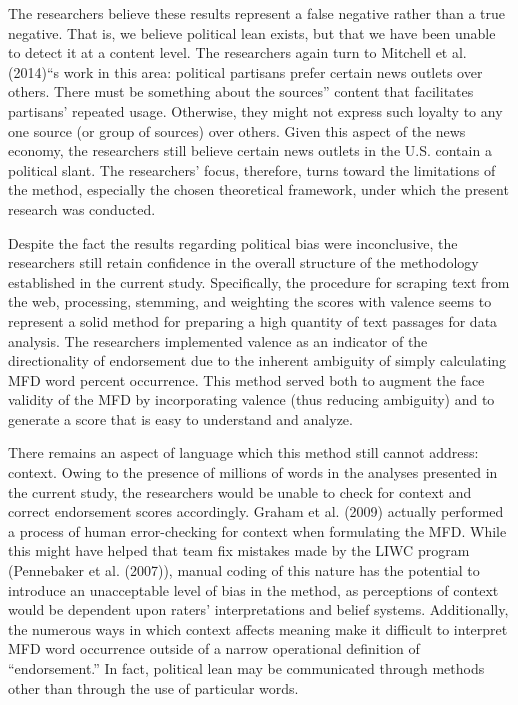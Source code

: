 \documentclass[english,,man]{apa6}
\begin{document}
The researchers believe these results represent a false negative rather than a true negative. That is, we believe political lean exists, but that we have been unable to detect it at a content level. The researchers again turn to Mitchell et al. (2014)\enquote{s work in this area: political partisans prefer certain news outlets over others. There must be something about the sources} content that facilitates partisans' repeated usage. Otherwise, they might not express such loyalty to any one source (or group of sources) over others. Given this aspect of the news economy, the researchers still believe certain news outlets in the U.S. contain a political slant. The researchers' focus, therefore, turns toward the limitations of the method, especially the chosen theoretical framework, under which the present research was conducted.

Despite the fact the results regarding political bias were inconclusive, the researchers still retain confidence in the overall structure of the methodology established in the current study. Specifically, the procedure for scraping text from the web, processing, stemming, and weighting the scores with valence seems to represent a solid method for preparing a high quantity of text passages for data analysis. The researchers implemented valence as an indicator of the directionality of endorsement due to the inherent ambiguity of simply calculating MFD word percent occurrence. This method served both to augment the face validity of the MFD by incorporating valence (thus reducing ambiguity) and to generate a score that is easy to understand and analyze.

There remains an aspect of language which this method still cannot address: context. Owing to the presence of millions of words in the analyses presented in the current study, the researchers would be unable to check for context and correct endorsement scores accordingly. Graham et al. (2009) actually performed a process of human error-checking for context when formulating the MFD. While this might have helped that team fix mistakes made by the LIWC program (Pennebaker et al. (2007)), manual coding of this nature has the potential to introduce an unacceptable level of bias in the method, as perceptions of context would be dependent upon raters' interpretations and belief systems. Additionally, the numerous ways in which context affects meaning make it difficult to interpret MFD word occurrence outside of a narrow operational definition of \enquote{endorsement.} In fact, political lean may be communicated through methods other than through the use of particular words.
\end{document}
